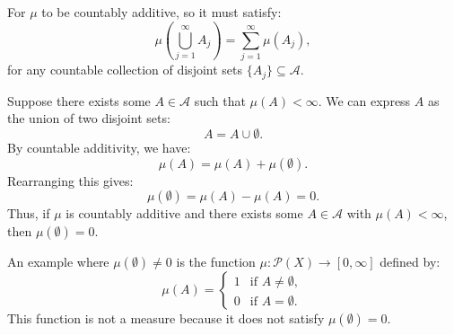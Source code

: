 \documentclass[11pt]{article}
\begin{document}
For \(\mu\) to be countably additive, so it must satisfy:
\[\mu\left(\bigcup_{j=1}^{\infty} A_j\right) = \sum_{j=1}^{\infty} \mu(A_j),\]
for any countable collection of disjoint sets \(\{A_j\} \subseteq \mathcal{A}\).

Suppose there exists some \(A \in \mathcal{A}\) such that \(\mu(A) < \infty\). We can express \(A\) as the union of two disjoint sets:
\[A = A \cup \emptyset.\]
By countable additivity, we have:
\[\mu(A) = \mu(A) + \mu(\emptyset).\]
Rearranging this gives:
\[\mu(\emptyset) = \mu(A) - \mu(A) = 0.\]
Thus, if \(\mu\) is countably additive and there exists some \(A \in \mathcal{A}\) with \(\mu(A) < \infty\), then \(\mu(\emptyset) = 0\).

An example where \(\mu(\emptyset) \neq 0\) is the function \(\mu : \mathcal{P}(X) \to [0, \infty]\) defined by:
\[\mu(A) = \begin{cases}
1 & \text{if } A \neq \emptyset, \\
0 & \text{if } A = \emptyset.
\end{cases}\]
This function is not a measure because it does not satisfy \(\mu(\emptyset) = 0\).
\end{document}
